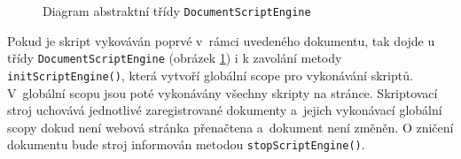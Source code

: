 \begin{figure}[H]
  \begin{center}
    \caption{Diagram abstraktní třídy \texttt{DocumentScriptEngine}}
    \label{Figure.DocumentScriptEngineDesign}
  \end{center}
\end{figure}

Pokud je skript vykováván poprvé v~rámci uvedeného dokumentu, tak dojde u třídy \texttt{DocumentScriptEngine} (obrázek \ref{Figure.DocumentScriptEngineDesign}) i k zavolání metody \texttt{initScriptEngine()}, která vytvoří globální scope pro vykonávání skriptů. V~globální scopu jsou poté vykonávány všechny skripty na stránce. Skriptovací stroj uchovává jednotlivé zaregistrované dokumenty a~jejich vykonávací globální scopy dokud není webová stránka přenačtena a~dokument není změněn. O zničení dokumentu bude stroj informován metodou \texttt{stopScriptEngine()}.

